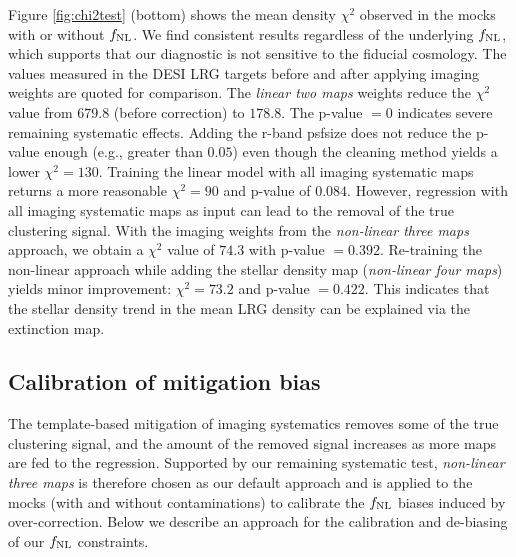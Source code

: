 Figure \ref{fig:chi2test} (bottom) shows the mean density $\chi^{2}$ observed in the mocks with or without $f_{\rm NL}$. We find consistent results regardless of the underlying $f_{\rm NL}$, which supports that our diagnostic is not sensitive to the fiducial cosmology. The values measured in the DESI LRG targets before and after applying imaging weights are quoted for comparison. The \textit{linear two maps} weights reduce the $\chi^{2}$ value from $679.8$ (before correction) to $178.8$. The p-value $=0$ indicates severe remaining systematic effects. Adding the r-band psfsize does not reduce the p-value enough (e.g., greater than $0.05$) even though the cleaning method yields a lower $\chi^{2}=130$. Training the linear model with all imaging systematic maps returns a more reasonable $\chi^{2}=90$ and p-value of $0.084$. However, regression with all imaging systematic maps as input can lead to the removal of the true clustering signal. With the imaging weights from the \textit{non-linear three maps} approach, we obtain a $\chi^{2}$ value of $74.3$ with p-value $=0.392$. Re-training the non-linear approach while adding the stellar density map (\textit{non-linear four maps}) yields minor improvement: $\chi^{2}=73.2$ and p-value $=0.422$.  This indicates that the stellar density trend in the mean LRG density can be explained via the extinction map. 





\subsection{Calibration of mitigation bias}\label{ssec:calibration}

 
The template-based mitigation of imaging systematics removes some of the true clustering signal, and the amount of the removed signal increases as more maps are fed to the regression. Supported by our remaining systematic test, \textit{non-linear three maps} is therefore chosen as our default approach and is applied to the mocks (with and without contaminations) to calibrate the $f_{\rm NL}$ biases induced by over-correction. Below we describe an approach for the calibration and de-biasing of our $f_{\rm NL}$ constraints. 

